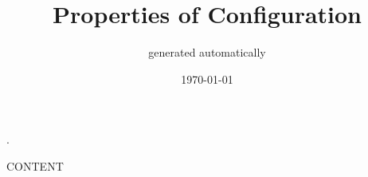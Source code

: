 \documentclass[12pt]{article}
\title{Properties of Configuration}
\author{generated automatically}
\date{\today}
\begin{document}
\maketitle
\thispagestyle{empty}

.

\newpage

CONTENT
\end{document}
